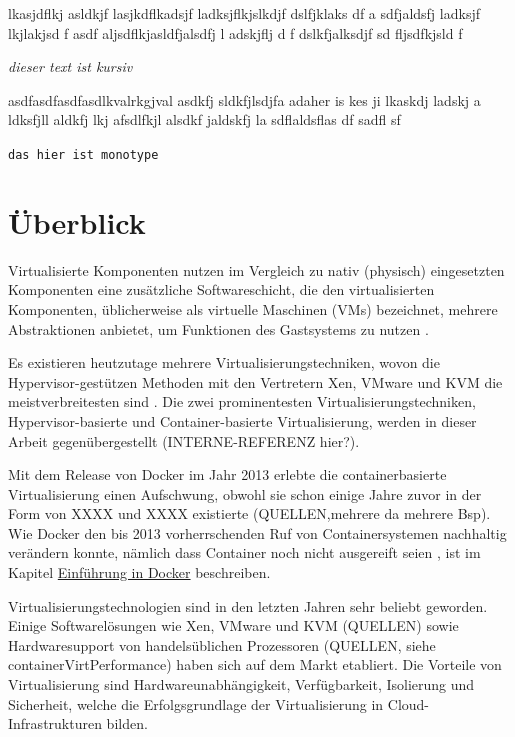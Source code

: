 \documentclass[11pt,a4paper,oneside]{report}
\begin{document}
lkasjdflkj asldkjf lasjkdflkadsjf ladksjflkjslkdjf    dslfjklaks df a sdfjaldsfj  ladksjf lkjlakjsd f asdf aljsdflkjasldfjalsdfj l adskjflj d f dslkfjalksdjf sd fljsdfkjsld f

\emph{dieser text ist kursiv}

asdfasdfasdfasdlkvalrkgjval  asdkfj  sldkfjlsdjfa adaher is kes ji lkaskdj ladskj a ldksfjll aldkfj lkj afsdlfkjl alsdkf jaldskfj la sdflaldsflas df sadfl sf

\texttt{das hier ist monotype}




\chapter{Überblick}
  Virtualisierte Komponenten nutzen im Vergleich zu nativ (physisch) eingesetzten Komponenten eine zusätzliche Softwareschicht, die den virtualisierten Komponenten, üblicherweise als virtuelle Maschinen (VMs) bezeichnet, mehrere Abstraktionen anbietet, um Funktionen des Gastsystems zu nutzen \cite[S.2]{containerVirtPerformance}.

  Es existieren heutzutage mehrere Virtualisierungstechniken, wovon die Hypervisor-gestützen Methoden mit den Vertretern Xen, VMware und KVM die meistverbreitesten sind \cite[S.2]{containerVirtPerformance}. Die zwei prominentesten Virtualisierungstechniken, Hypervisor-basierte und Container-basierte Virtualisierung, werden in dieser Arbeit gegenübergestellt (INTERNE-REFERENZ hier?).

  Mit dem Release von Docker im Jahr 2013 erlebte die containerbasierte Virtualisierung einen Aufschwung, obwohl sie schon einige Jahre zuvor in der Form von XXXX und XXXX existierte (QUELLEN,mehrere da mehrere Bsp). Wie Docker den bis 2013 vorherrschenden Ruf von Containersystemen nachhaltig verändern konnte, nämlich dass Container noch nicht ausgereift seien \cite[S.8]{containerVirtPerformance}, ist im Kapitel \hyperref[dockerIntro]{\glqq{}Einführung in Docker\glqq{}} beschreiben.



  Virtualisierungstechnologien sind in den letzten Jahren sehr beliebt geworden. Einige Softwarelösungen wie Xen, VMware und KVM (QUELLEN) sowie Hardwaresupport von handelsüblichen Prozessoren (QUELLEN, siehe containerVirtPerformance) haben sich auf dem Markt etabliert.
  Die Vorteile von Virtualisierung sind Hardwareunabhängigkeit, Verfügbarkeit, Isolierung und Sicherheit, welche die Erfolgsgrundlage der Virtualisierung in Cloud-Infrastrukturen bilden.
  \cite[S.1]{containerVirtPerformance}
\end{document}
